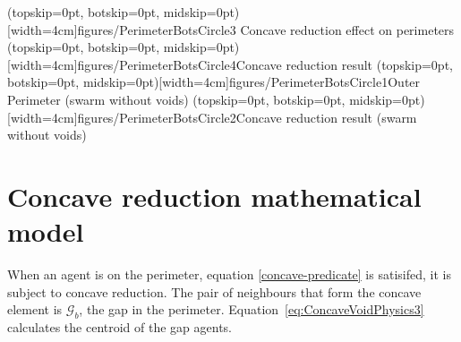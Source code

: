 \documentclass{ieeeaccess}
\begin{document}
\Figure[t!](topskip=0pt, botskip=0pt, midskip=0pt)[width=4cm]{figures/PerimeterBotsCircle3}
{Concave reduction effect on perimeters\label{fig:InnerPerimeter2}}
\Figure[t!](topskip=0pt, botskip=0pt, midskip=0pt)[width=4cm]{figures/PerimeterBotsCircle4}{Concave reduction result\label{fig:InnerPerimeter3}}
\Figure[t!](topskip=0pt, botskip=0pt, midskip=0pt)[width=4cm]{figures/PerimeterBotsCircle1}{Outer Perimeter (swarm without voids)\label{fig:OuterPerimeter2}}
\Figure[t!](topskip=0pt, botskip=0pt, midskip=0pt)[width=4cm]{figures/PerimeterBotsCircle2}{Concave reduction result (swarm without voids)\label{fig:OuterPerimeter3}}

\section{Concave reduction mathematical model}\label{concave:ConcaveVoidReduction1}
When an agent is on the perimeter, equation \ref{concave-predicate} is
satisifed, it is subject to concave reduction.
The pair of neighbours that form the concave element is $\mathcal G_b$, the
gap in the perimeter.
Equation~\ref{eq:ConcaveVoidPhysics3} calculates the centroid of the gap agents. 
\end{document}
